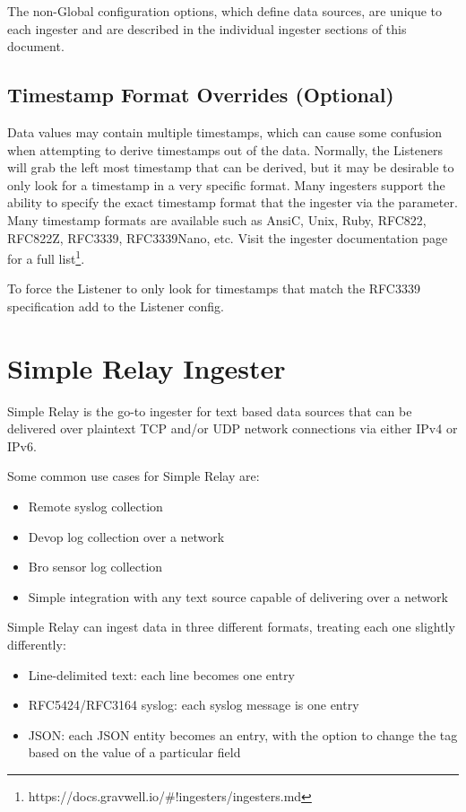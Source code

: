 The non-Global configuration options, which define data sources, are
unique to each ingester and are described in the individual ingester
sections of this document.

\subsection{Timestamp Format Overrides (Optional)}

Data values may contain multiple timestamps, which can cause some
confusion when attempting to derive timestamps out of the data.
Normally, the Listeners will grab the left most timestamp that can be
derived, but it may be desirable to only look for a timestamp in a very
specific format. Many ingesters support the ability to specify the
exact timestamp format that the ingester via the
 parameter. Many timestamp
formats are available such as AnsiC, Unix, Ruby, RFC822, RFC822Z,
RFC3339, RFC3339Nano, etc. Visit the ingester documentation page for a
full list\footnote{https://docs.gravwell.io/\#!ingesters/ingesters.md}.

To force the Listener to only look for timestamps that match the
RFC3339 specification add  to the
Listener config.

\section{Simple Relay Ingester}

Simple Relay is the go-to ingester for text based data sources that can
be delivered over plaintext TCP and/or UDP network connections via
either IPv4 or IPv6.

Some common use cases for Simple Relay are:

\begin{itemize}
\item
  Remote syslog collection
\item
  Devop log collection over a network
\item
  Bro sensor log collection
\item
  Simple integration with any text source capable of delivering over a
  network
\end{itemize}

Simple Relay can ingest data in three different formats, treating each
one slightly differently:

\begin{itemize}
\item
  Line-delimited text: each line becomes one entry
\item
  RFC5424/RFC3164 syslog: each syslog message is one entry
\item
  JSON: each JSON entity becomes an entry, with the option to change
  the tag based on the value of a particular field
\end{itemize}

